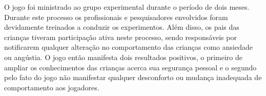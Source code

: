 O jogo foi ministrado ao grupo experimental durante o período de dois meses. %
Durante este processo os profissionais e pesquisadores envolvidos foram devidamente treinados a conduzir os experimentos. Além disso, os pais das crianças tiveram participação ativa neste processo, sendo responsáveis por notificarem qualquer alteração no comportamento das crianças como ansiedade ou angústia. O jogo então manifesta dois resultados positivos, o primeiro de ampliar os conhecimentos das crianças acerca sua segurança pessoal e o segundo pelo fato do jogo não manifestar qualquer desconforto ou mudança inadequada de comportamento aos jogadores. 










